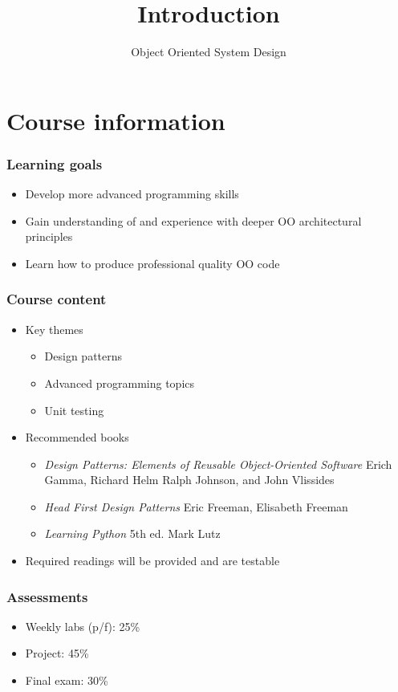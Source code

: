 \documentclass[10pt]{beamer}
\title{Introduction}
\author[IN710]{Object Oriented System Design}
\institute[Otago Polytechnic]{
  Otago Polytechnic \\
  Dunedin, New Zealand \\
}
\date{}
\begin{document}
\begin{frame}[plain]
  \titlepage
\end{frame}

\section{Course information}
\begin{frame}
  \frametitle{Learning goals}

 \begin{itemize}
  \item Develop more advanced programming skills
  \item Gain understanding of and experience with deeper
	  OO architectural principles
  \item Learn how to produce professional quality OO code
  \end{itemize}
\end{frame}

\begin{frame}
	\frametitle{Course content}
	\begin{itemize}
		\item Key themes
			\begin{itemize}
				\item Design patterns
				\item Advanced programming topics
				\item Unit testing
			\end{itemize}
		\item Recommended books
			\begin{itemize}
				\item \emph{Design Patterns: Elements of
						Reusable Object-Oriented
					Software} Erich Gamma, Richard Helm
					Ralph Johnson, and John Vlissides
				\item \emph{Head First Design Patterns}
					Eric Freeman, Elisabeth Freeman
				\item \emph{Learning Python} 5th ed. 
					Mark Lutz
			\end{itemize}
		\item Required readings will be provided and are testable
	\end{itemize}
\end{frame}

\begin{frame}
	\frametitle{Assessments}
	\begin{itemize}
		\item Weekly labs (p/f): 25\%
		\item Project: 45\%
		\item Final exam: 30\%
	\end{itemize}
\end{frame}
\end{document}

